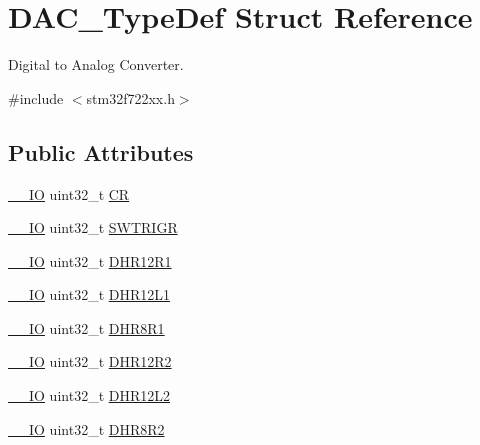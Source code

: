 \hypertarget{struct_d_a_c___type_def}{}\section{D\+A\+C\+\_\+\+Type\+Def Struct Reference}
\label{struct_d_a_c___type_def}


Digital to Analog Converter.  




{\ttfamily \#include $<$stm32f722xx.\+h$>$}

\subsection*{Public Attributes}
\begin{DoxyCompactItemize}
\item 
\mbox{\hyperlink{core__sc300_8h_aec43007d9998a0a0e01faede4133d6be}{\+\_\+\+\_\+\+IO}} uint32\+\_\+t \mbox{\hyperlink{struct_d_a_c___type_def_a394324f0b573837ca15a87127b2a37ea}{CR}}
\item 
\mbox{\hyperlink{core__sc300_8h_aec43007d9998a0a0e01faede4133d6be}{\+\_\+\+\_\+\+IO}} uint32\+\_\+t \mbox{\hyperlink{struct_d_a_c___type_def_a4ccb66068a1ebee1179574dda20206b6}{S\+W\+T\+R\+I\+GR}}
\item 
\mbox{\hyperlink{core__sc300_8h_aec43007d9998a0a0e01faede4133d6be}{\+\_\+\+\_\+\+IO}} uint32\+\_\+t \mbox{\hyperlink{struct_d_a_c___type_def_afbfd2855cdb81939b4efc58e08aaf3e5}{D\+H\+R12\+R1}}
\item 
\mbox{\hyperlink{core__sc300_8h_aec43007d9998a0a0e01faede4133d6be}{\+\_\+\+\_\+\+IO}} uint32\+\_\+t \mbox{\hyperlink{struct_d_a_c___type_def_a5eb63912e39085e3e13d64bdb0cf38bd}{D\+H\+R12\+L1}}
\item 
\mbox{\hyperlink{core__sc300_8h_aec43007d9998a0a0e01faede4133d6be}{\+\_\+\+\_\+\+IO}} uint32\+\_\+t \mbox{\hyperlink{struct_d_a_c___type_def_a3a382d341fb608a04390bacb8c00b0f0}{D\+H\+R8\+R1}}
\item 
\mbox{\hyperlink{core__sc300_8h_aec43007d9998a0a0e01faede4133d6be}{\+\_\+\+\_\+\+IO}} uint32\+\_\+t \mbox{\hyperlink{struct_d_a_c___type_def_ab1f777540c487c26bf27e6fa37a644cc}{D\+H\+R12\+R2}}
\item 
\mbox{\hyperlink{core__sc300_8h_aec43007d9998a0a0e01faede4133d6be}{\+\_\+\+\_\+\+IO}} uint32\+\_\+t \mbox{\hyperlink{struct_d_a_c___type_def_a9f612b6b3e065e810e5a2fb254d6a40b}{D\+H\+R12\+L2}}
\item 
\mbox{\hyperlink{core__sc300_8h_aec43007d9998a0a0e01faede4133d6be}{\+\_\+\+\_\+\+IO}} uint32\+\_\+t \mbox{\hyperlink{struct_d_a_c___type_def_a3b096b71656f8fb32cd18b4c8b1d2334}{D\+H\+R8\+R2}}

\end{DoxyCompactItemize}
